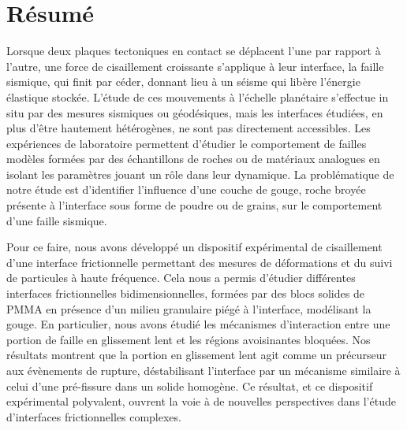 { \let\cleardoublepage\relax
\chapter*{Résumé} }
\thispagestyle{empty}

Lorsque deux plaques tectoniques en contact se déplacent l'une par rapport à l'autre, une force de cisaillement croissante s'applique à leur interface, la faille sismique, qui finit par céder, donnant lieu à un séisme qui libère l'énergie élastique stockée. L'étude de ces mouvements à l'échelle planétaire s'effectue in situ par des mesures sismiques ou géodésiques, mais les interfaces étudiées, en plus d'être hautement hétérogènes, ne sont pas directement accessibles. Les expériences de laboratoire permettent d'étudier le comportement de failles modèles formées par des échantillons de roches ou de matériaux analogues en isolant les paramètres jouant un rôle dans leur dynamique. La problématique de notre étude est d'identifier l'influence d'une couche de gouge, roche broyée présente à l'interface sous forme de poudre ou de grains, sur le comportement d'une faille sismique.

Pour ce faire, nous avons développé un dispositif expérimental de cisaillement d'une interface frictionnelle permettant des mesures de déformations et du suivi de particules à haute fréquence. Cela nous a permis d'étudier différentes interfaces frictionnelles bidimensionnelles, formées par des blocs solides de PMMA en présence d'un milieu granulaire piégé à l'interface, modélisant la gouge. En particulier, nous avons étudié les mécanismes d'interaction entre une portion de faille en glissement lent et les régions avoisinantes bloquées. Nos résultats montrent que la portion en glissement lent agit comme un précurseur aux évènements de rupture, déstabilisant l'interface par un mécanisme similaire à celui d'une pré-fissure dans un solide homogène. Ce résultat, et ce dispositif expérimental polyvalent, ouvrent la voie à de nouvelles perspectives dans l'étude d'interfaces frictionnelles complexes.


